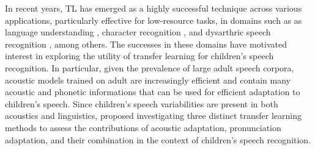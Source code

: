 In recent years, TL has emerged as a highly successful technique across various applications, particularly effective for low-resource tasks, in domains such as as language understanding \cite{Bert}, character recognition \cite{tfcharacter}, and dysarthric speech recognition \cite{tfpathology}, among others. The successes in these domains have motivated interest in exploring the utility of transfer learning for children's speech recognition. In particular, given the prevalence of large adult speech corpora, acoustic models trained on adult  are increasingly efficient and contain many acoustic and phonetic informations that can be used for efficient adaptation to children's speech. Since children's speech variabilities are present in both acoustics and linguistics, \cite{TFchildren} proposed investigating three distinct transfer learning methods to assess the contributions of acoustic adaptation, pronunciation adaptation, and their combination in the context of children's speech recognition.


